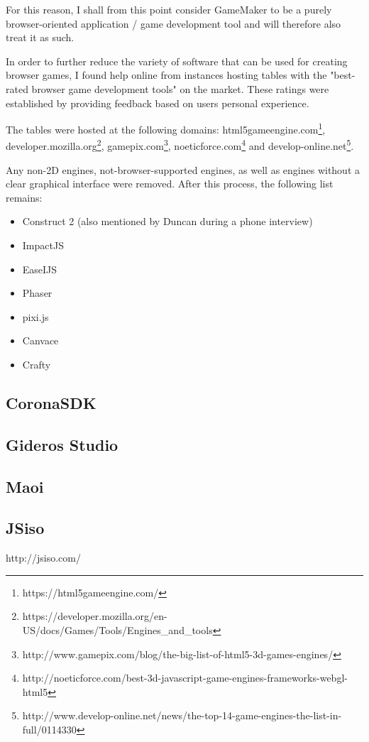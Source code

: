 \documentclass[bsc,frontabs,twoside,singlespacing,parskip,deptreport]{infthesis}     %
\begin{document}
For this reason, I shall from this point consider GameMaker to be a purely browser-oriented application / game development tool and will therefore also treat it as such.

In order to further reduce the variety of software that can be used for creating browser games, I found help online from instances hosting tables with the "best-rated browser game development tools" on the market. These ratings were established by providing feedback based on users personal experience.

The tables were hosted at the following domains:
html5gameengine.com\footnote{https://html5gameengine.com/}, 
developer.mozilla.org\footnote{https://developer.mozilla.org/en-US/docs/Games/Tools/Engines\_and\_tools}, 
gamepix.com\footnote{http://www.gamepix.com/blog/the-big-list-of-html5-3d-games-engines/}, 
noeticforce.com\footnote{http://noeticforce.com/best-3d-javascript-game-engines-frameworks-webgl-html5} and 
develop-online.net\footnote{http://www.develop-online.net/news/the-top-14-game-engines-the-list-in-full/0114330}.

Any non-2D engines, not-browser-supported engines, as well as engines without a clear graphical interface were removed. After this process, the following list remains:
\begin{itemize}
\item Construct 2 (also mentioned by Duncan during a phone interview\cite{Gamemaker_DnD})
\item ImpactJS
\item EaseIJS
\item Phaser
\item pixi.js
\item Canvace
\item Crafty
\end{itemize}

\subsection{CoronaSDK}
\subsection{Gideros Studio}
\subsection{Maoi}

\subsection{JSiso}http://jsiso.com/
\end{document}
